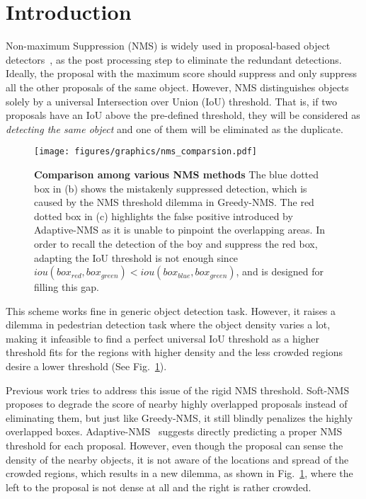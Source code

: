 \documentclass[sigconf]{acmart}
\begin{document}
\section{Introduction}



Non-maximum Suppression (NMS) is widely used in proposal-based object detectors~\cite{yolo-v1, yolo-v2, yolo-v3, ssd, dssd, rcnn, fast-rcnn, faster-rcnn, fpn, mask-rcnn, cascade-rcnn, rfcn, deformable, focal-loss}, as the post processing step to eliminate the redundant detections. Ideally, the proposal with the maximum score should suppress and only suppress all the other proposals of the same object. However, NMS distinguishes objects solely by a universal Intersection over Union (IoU) threshold. That is, if two proposals have an IoU above the pre-defined threshold, they will be considered as \textit{detecting the same object} and one of them will be eliminated as the duplicate.

\begin{figure}[t]
\begin{center}
\texttt{[image: figures/graphics/nms\_comparsion.pdf]}
\end{center}
\vspace{-0.3cm}
\caption{\textbf{Comparison among various NMS methods} {\normalfont The blue dotted box in (b) shows the mistakenly suppressed detection, which is caused by the NMS threshold dilemma in Greedy-NMS. The red dotted box in (c) highlights the false positive introduced by Adaptive-NMS as it is unable to pinpoint the overlapping areas. In order to recall the detection of the boy and suppress the red box, adapting the IoU threshold is not enough since $iou(box_{red}, box_{green}) < iou(box_{blue}, box_{green})$, and \heatmapnameshort{} is designed for filling this gap.}}
\vspace{-0.3cm}
\label{fig:intro}
\end{figure}
%
 This scheme works fine in generic object detection task. However, it raises a dilemma in pedestrian detection task where the object density varies a lot, making it infeasible to find a perfect universal IoU threshold as a higher threshold fits for the regions with higher density and the less crowded regions desire a lower threshold (See Fig.~\ref{fig:intro}).

Previous work tries to address this issue of the rigid NMS threshold. Soft-NMS~\cite{soft-nms} proposes to degrade the score of nearby highly overlapped proposals instead of eliminating them, but just like Greedy-NMS, it still blindly penalizes the highly overlapped boxes. Adaptive-NMS~\cite{adaptive-nms} suggests directly predicting a proper NMS threshold for each proposal. However, even though the proposal can sense the density of the nearby objects, it is not aware of the locations and spread of the crowded regions, which results in a new dilemma, as shown in Fig.~\ref{fig:intro}, where the left to the proposal is not dense at all and the right is rather crowded.
\end{document}
